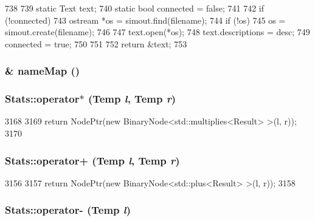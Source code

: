 \begin{DoxyCode}
738 {
739     static Text text;
740     static bool connected = false;
741 
742     if (!connected) {
743         ostream *os = simout.find(filename);
744         if (!os)
745             os = simout.create(filename);
746 
747         text.open(*os);
748         text.descriptions = desc;
749         connected = true;
750     }
751 
752     return &text;
753 }
\end{DoxyCode}
\hypertarget{namespaceStats_afb176e85b0894034fbc81210827060d9}{
\subsubsection[{nameMap}]{ \& nameMap ()}}
\label{namespaceStats_afb176e85b0894034fbc81210827060d9}
\hypertarget{namespaceStats_a0f00b6da1f44e697da7eccba495d94ef}{
\subsubsection[{operator$\ast$}]{ Stats::operator$\ast$ (Temp {\em l}, \/  Temp {\em r})}}
\label{namespaceStats_a0f00b6da1f44e697da7eccba495d94ef}



\begin{DoxyCode}
3168 {
3169     return NodePtr(new BinaryNode<std::multiplies<Result> >(l, r));
3170 }
\end{DoxyCode}
\hypertarget{namespaceStats_ad753c7cf585098bfeb9428b578549f6d}{
\subsubsection[{operator+}]{ Stats::operator+ (Temp {\em l}, \/  Temp {\em r})}}
\label{namespaceStats_ad753c7cf585098bfeb9428b578549f6d}



\begin{DoxyCode}
3156 {
3157     return NodePtr(new BinaryNode<std::plus<Result> >(l, r));
3158 }
\end{DoxyCode}
\hypertarget{namespaceStats_aa6b877c1ac1451430742f23cdd1a6690}{
\subsubsection[{operator-\/}]{ Stats::operator-\/ (Temp {\em l})}}
\label{namespaceStats_aa6b877c1ac1451430742f23cdd1a6690}



